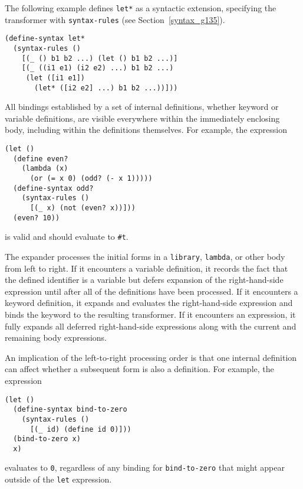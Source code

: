 The following example defines \texttt{let*} as a syntactic extension,
specifying the transformer with \texttt{syntax-rules} (see Section \ref{syntax_g135}).


\begin{alltt}
(define-syntax let*
  (syntax-rules ()
    [(\_{} () b1 b2 ...) (let () b1 b2 ...)]
    [(\_{} ((i1 e1) (i2 e2) ...) b1 b2 ...)
     (let ([i1 e1])
       (let* ([i2 e2] ...) b1 b2 ...))]))
\end{alltt}


All bindings established by a set of internal definitions, whether
keyword or variable definitions, are visible everywhere within the
immediately enclosing body, including within the definitions themselves.
For example, the expression


\begin{alltt}
(let ()
  (define even?
    (lambda (x)
      (or (= x 0) (odd? (- x 1)))))
  (define-syntax odd?
    (syntax-rules ()
      [(\_{} x) (not (even? x))]))
  (even? 10))
\end{alltt}


is valid and should evaluate to \texttt{\#{}t}.


\label{syntax_body_expansion}The expander processes the initial forms in a \texttt{library}, \texttt{lambda}, or other
body from left to right.
If it encounters a variable definition, it records the fact that the
defined identifier is a variable but defers expansion of the
right-hand-side expression until after all of the definitions have
been processed.
If it encounters a keyword definition, it expands and evaluates the
right-hand-side expression and binds the keyword to the resulting
transformer.
If it encounters an expression, it fully expands all deferred
right-hand-side expressions along with the current and remaining
body expressions.


An implication of the left-to-right processing order is that one
internal definition can affect whether a subsequent form is also a
definition.
For example, the expression


\begin{alltt}
(let ()
  (define-syntax bind-to-zero
    (syntax-rules ()
      [(\_{} id) (define id 0)]))
  (bind-to-zero x)
  x)
\end{alltt}


evaluates to \texttt{0}, regardless of any binding for
\texttt{bind-to-zero} that might appear outside of the \texttt{let}
expression.



